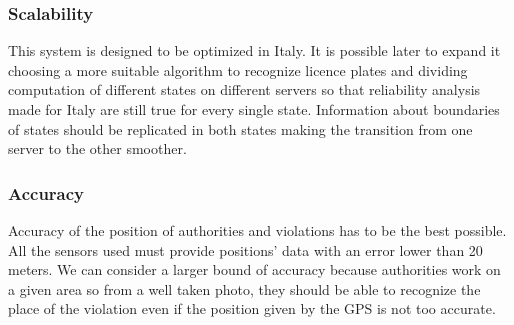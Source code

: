 \subsubsection{Scalability}
This system is designed to be optimized in Italy. It is possible later to expand it choosing a more suitable algorithm to recognize licence plates and dividing computation of different states on different servers so that reliability analysis made for Italy are still true for every single state. Information about boundaries of states should be replicated in both states making the transition from one server to the other smoother.
\subsubsection{Accuracy}
Accuracy of the position of authorities and violations has to be the best possible. All the sensors used must provide positions' data with an error lower than 20 meters. We can consider a larger bound of accuracy because authorities work on a given area so from a well taken photo, they should be able to recognize the place of the violation even if the position given by the GPS is not too accurate.










